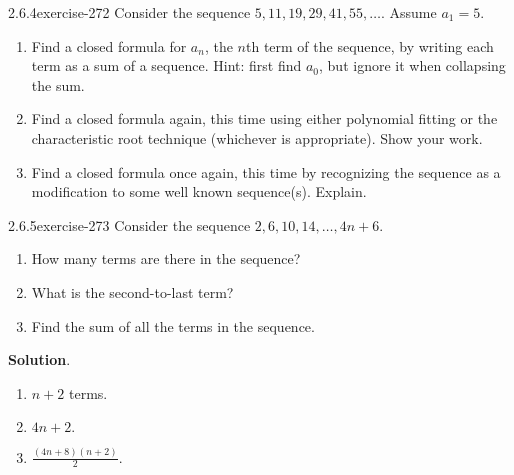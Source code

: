 \documentclass[twoside,11pt,]{book}
\numberwithin{equation}{chapter}
\begin{document}
\begin{divisionsolution}{2.6.4}{}{exercise-272}%
\hypertarget{p-3748}{}%
Consider the sequence \(5, 11, 19, 29, 41, 55,\ldots\). Assume \(a_1 = 5\).\leavevmode%
\begin{enumerate}[label=(\alph*)]
\item\hypertarget{li-1991}{}\hypertarget{p-3749}{}%
Find a closed formula for \(a_n\), the \(n\)th term of the sequence, by writing each term as a sum of a sequence. Hint: first find \(a_0\), but ignore it when collapsing the sum. %
\item\hypertarget{li-1992}{}\hypertarget{p-3750}{}%
Find a closed formula again, this time using either polynomial fitting or the characteristic root technique (whichever is appropriate). Show your work. %
\item\hypertarget{li-1993}{}\hypertarget{p-3751}{}%
Find a closed formula once again, this time by recognizing the sequence as a modification to some well known sequence(s). Explain. %
\end{enumerate}
%
\end{divisionsolution}%
\begin{divisionsolution}{2.6.5}{}{exercise-273}%
\hypertarget{p-3760}{}%
Consider the sequence \(2, 6, 10, 14, \ldots, 4n + 6\text{.}\)\leavevmode%
\begin{enumerate}[label=(\alph*)]
\item\hypertarget{li-2000}{}\hypertarget{p-3761}{}%
How many terms are there in the sequence?%
\item\hypertarget{li-2001}{}\hypertarget{p-3763}{}%
What is the second-to-last term?%
\item\hypertarget{li-2002}{}\hypertarget{p-3765}{}%
Find the sum of all the terms in the sequence.%
\end{enumerate}
%
\par\smallskip%
\noindent\textbf{Solution}.\quad%
\hypertarget{p-3767}{}%
\leavevmode%
\begin{enumerate}[label=(\alph*)]
\item\hypertarget{li-2003}{}\hypertarget{p-3768}{}%
\(n+2\) terms.%
\item\hypertarget{li-2004}{}\hypertarget{p-3769}{}%
\(4n+2\text{.}\)%
\item\hypertarget{li-2005}{}\hypertarget{p-3770}{}%
\(\frac{(4n+8)(n+2)}{2}\text{.}\)%
\end{enumerate}
%
\end{divisionsolution}%
\end{document}
